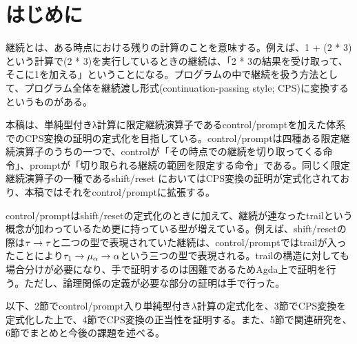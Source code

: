 \section{はじめに}
継続とは、ある時点における残りの計算のことを意味する。例えば、1 + (2 * 3)という計算で(2 * 3)を実行しているときの継続は、「2 * 3の結果を受け取って、そこに1を加える」ということになる。プログラムの中で継続を扱う方法として、プログラム全体を継続渡し形式(continuation-passing style; CPS)に変換するというものがある。

本稿は、単純型付きλ計算に限定継続演算子であるcontrol/prompt\cite{POPL88}を加えた体系でのCPS変換の証明の定式化を目指している。control/promptは四種ある限定継続演算子のうちの一つで、controlが「その時点での継続を切り取ってくる命令」、promptが「切り取られる継続の範囲を限定する命令」である。同じく限定継続演算子の一種であるshift/reset\cite{DF1990} においてはCPS変換の証明が定式化されており、本稿ではそれをcontrol/promptに拡張する。

control/promptはshift/resetの定式化のときに加えて、継続が連なったtrailという概念が加わっているため更に持っている型が増えている。例えば、shift/resetの際は${\tau}\rightarrow{\tau}$と二つの型で表現されていた継続は、control/promptではtrailが入ったことにより${\tau_1}\rightarrow{{\mu_{\alpha}}\rightarrow{\alpha}}$という三つの型で表現される。trailの構造に対しても場合分けが必要になり、手で証明するのは困難であるためAgda上で証明を行う。ただし、論理関係の定義が必要な部分の証明は手で行った。

以下、2節でcontrol/prompt入り単純型付き$\lambda$計算の定式化を、3節でCPS変換を定式化した上で、4節でCPS変換の正当性を証明する。また、5節で関連研究を、6節でまとめと今後の課題を述べる。
